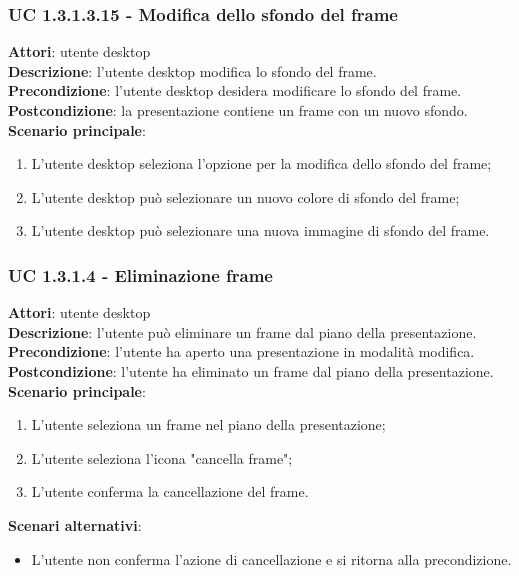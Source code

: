 \subsubsection{UC 1.3.1.3.15 - Modifica dello sfondo del frame}{
	\label{uc1.3.1.3.15}
	\textbf{Attori}: utente desktop \\
	\textbf{Descrizione}: l'utente desktop modifica lo sfondo del frame. \\
	\textbf{Precondizione}: l'utente desktop desidera modificare lo sfondo del frame.	\\
	\textbf{Postcondizione}: la presentazione contiene un frame con un nuovo sfondo.	\\
	\textbf{Scenario principale}:
	\begin{enumerate}
		\item L'utente desktop seleziona l'opzione per la modifica dello sfondo del frame;
		\item L'utente desktop può selezionare un nuovo colore di sfondo del frame;
		\item L'utente desktop può selezionare una nuova immagine di sfondo del frame.
	\end{enumerate}
	}
\subsubsection{UC 1.3.1.4 - Eliminazione frame}{
	\label{uc1.3.1.4}
	\textbf{Attori}: utente desktop \\
	\textbf{Descrizione}: l'utente può eliminare un frame dal piano della presentazione. \\
	\textbf{Precondizione}: l'utente ha aperto una presentazione in modalità modifica.	\\
	\textbf{Postcondizione}: l'utente ha eliminato un frame dal piano della presentazione.	\\
	\textbf{Scenario principale}:
	\begin{enumerate}
		\item L'utente seleziona un frame nel piano della presentazione;
		\item L'utente seleziona l'icona "cancella frame";
		\item L'utente conferma la cancellazione del frame.
	\end{enumerate}
	\textbf{Scenari alternativi}: 
	\begin{itemize}
		\item L'utente non conferma l'azione di cancellazione e si ritorna alla precondizione.
	\end{itemize}
}
